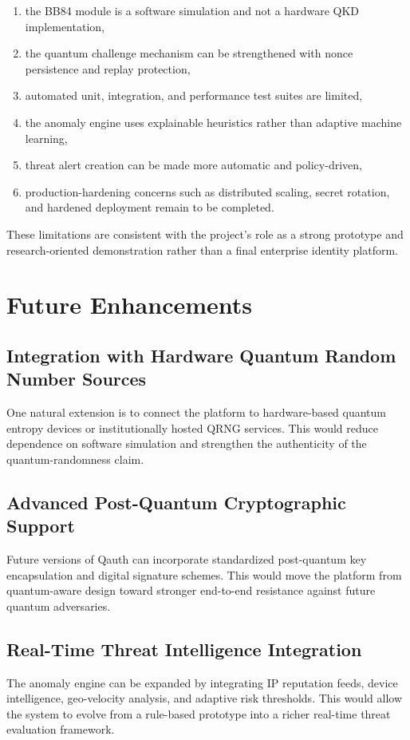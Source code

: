 \begin{enumerate}
    \item the BB84 module is a software simulation and not a hardware QKD implementation,
    \item the quantum challenge mechanism can be strengthened with nonce persistence and replay protection,
    \item automated unit, integration, and performance test suites are limited,
    \item the anomaly engine uses explainable heuristics rather than adaptive machine learning,
    \item threat alert creation can be made more automatic and policy-driven,
    \item production-hardening concerns such as distributed scaling, secret rotation, and hardened deployment remain to be completed.
\end{enumerate}

These limitations are consistent with the project's role as a strong prototype and research-oriented demonstration rather than a final enterprise identity platform.

\section{Future Enhancements}

\subsection{Integration with Hardware Quantum Random Number Sources}
One natural extension is to connect the platform to hardware-based quantum entropy devices or institutionally hosted QRNG services. This would reduce dependence on software simulation and strengthen the authenticity of the quantum-randomness claim.

\subsection{Advanced Post-Quantum Cryptographic Support}
Future versions of Qauth can incorporate standardized post-quantum key encapsulation and digital signature schemes. This would move the platform from quantum-aware design toward stronger end-to-end resistance against future quantum adversaries.

\subsection{Real-Time Threat Intelligence Integration}
The anomaly engine can be expanded by integrating IP reputation feeds, device intelligence, geo-velocity analysis, and adaptive risk thresholds. This would allow the system to evolve from a rule-based prototype into a richer real-time threat evaluation framework.


